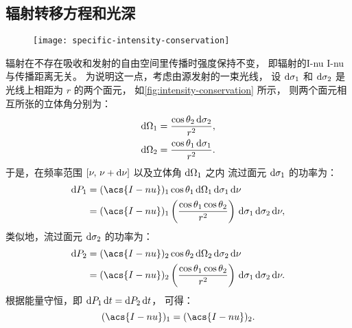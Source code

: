 \subsection{辐射转移方程和光深}
\label{sec:radiative-transfer}

\begin{figure}[htp]
  \centering
  \texttt{[image: specific-intensity-conservation]}
  \label{fig:intensity-conservation}
\end{figure}

辐射在不存在吸收和发射的自由空间里传播时强度保持不变，
即辐射的\acl*{I-nu} \acs*{I-nu} 与传播距离无关。
为说明这一点，考虑由源发射的一束光线，
设 $\mathrm{d}\sigma_1$ 和 $\mathrm{d}\sigma_2$ 是光线上相距为 $r$ 的两个面元，
如\autoref{fig:intensity-conservation} 所示，
则两个面元相互所张的立体角分别为：
\begin{align}
  \mathrm{d}\Omega_1 & = \frac{\cos\theta_2 \,\mathrm{d}\sigma_2}{r^2} , \\
  \mathrm{d}\Omega_2 & = \frac{\cos\theta_1 \,\mathrm{d}\sigma_1}{r^2} .
\end{align}
于是，在频率范围 $[\nu, \,\nu+\mathrm{d}\nu]$ 以及立体角 $\mathrm{d}\Omega_1$ 之内
流过面元 $\mathrm{d}\sigma_1$ 的功率为：
\begin{align}
  \D{P_1} & = (\acs{I-nu})_1 \cos\theta_1
      \,\D{\Omega_1} \,\D{\sigma_1} \,\D{\nu}  \\
    & = (\acs{I-nu})_1 \left( \frac{\cos\theta_1 \cos\theta_2}{r^2} \right)
      \,\D{\sigma_1} \,\D{\sigma_2} \,\D{\nu} ,
\end{align}
类似地，流过面元 $\mathrm{d}\sigma_2$ 的功率为：
\begin{align}
  \D{P_2} & = (\acs{I-nu})_2 \cos\theta_2
      \,\D{\Omega_2} \,\D{\sigma_2} \,\D{\nu}  \\
    & = (\acs{I-nu})_2 \left( \frac{\cos\theta_1 \cos\theta_2}{r^2} \right)
      \,\D{\sigma_1} \,\D{\sigma_2} \,\D{\nu} .
\end{align}
根据能量守恒，即 $\mathrm{d}P_1\,\mathrm{d}t = \mathrm{d}P_2\,\mathrm{d}t$，
可得：
\begin{equation}
  \label{eq:intensity-conservation}
  (\acs{I-nu})_1 = (\acs{I-nu})_2 .
\end{equation}

